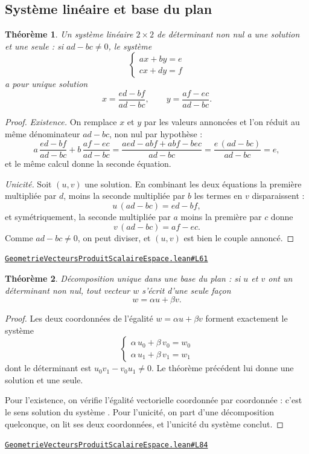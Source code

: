 \documentclass[11pt,a4paper]{article}
\theoremstyle{definition}
\theoremstyle{plain}
\newtheorem{theoreme}{Théorème}
\newcommand{\source}[2]{\par\smallskip\noindent\hfill{\footnotesize\href{#1}{\texttt{#2}}}\par\smallskip}
\begin{document}
\subsection{Système linéaire et base du plan}

\begin{theoreme}
Un système linéaire $2 \times 2$ de déterminant non nul a une solution et une seule :
si $ad - bc \ne 0$, le système
\[ \begin{cases} ax + by = e \\ cx + dy = f \end{cases} \]
a pour unique solution
\[ x = \frac{ed - bf}{ad - bc}, \qquad y = \frac{af - ec}{ad - bc} . \]
\end{theoreme}

\begin{proof}
\emph{Existence.} On remplace $x$ et $y$ par les valeurs annoncées et l'on réduit au même
dénominateur $ad - bc$, non nul par hypothèse :
\[ a\,\frac{ed - bf}{ad - bc} + b\,\frac{af - ec}{ad - bc}
   = \frac{aed - abf + abf - bec}{ad - bc}
   = \frac{e\,(ad - bc)}{ad - bc} = e , \]
et le même calcul donne la seconde équation.

\emph{Unicité.} Soit $(u, v)$ une solution. En combinant les deux équations \textemdash{}
la première multipliée par $d$, moins la seconde multipliée par $b$ \textemdash{} les
termes en $v$ disparaissent :
\[ u\,(ad - bc) = ed - bf , \]
et symétriquement, la seconde multipliée par $a$ moins la première par $c$ donne
\[ v\,(ad - bc) = af - ec . \]
Comme $ad - bc \ne 0$, on peut diviser, et $(u, v)$ est bien le couple annoncé.
\end{proof}
\source{https://github.com/Commutator-IO/learn-lean/blob/main/courses/02-lycee/08-geometrie-vecteurs-produit-scalaire-espace/GeometrieVecteursProduitScalaireEspace.lean\#L61}{GeometrieVecteursProduitScalaireEspace.lean\#L61}

\begin{theoreme}
Décomposition unique dans une base du plan : si $u$ et $v$ ont un déterminant non nul,
tout vecteur $w$ s'écrit d'une seule façon
\[ w = \alpha u + \beta v . \]
\end{theoreme}

\begin{proof}
Les deux coordonnées de l'égalité $w = \alpha u + \beta v$ forment exactement le système
\[ \begin{cases} \alpha\,u_0 + \beta\,v_0 = w_0 \\ \alpha\,u_1 + \beta\,v_1 = w_1 \end{cases} \]
dont le déterminant est $u_0 v_1 - v_0 u_1 \ne 0$. Le théorème précédent lui donne une
solution et une seule.

Pour l'existence, on vérifie l'égalité vectorielle coordonnée par coordonnée : c'est le
sens \og{} solution du système \fg{}. Pour l'unicité, on part d'une décomposition
quelconque, on lit ses deux coordonnées, et l'unicité du système conclut.
\end{proof}
\source{https://github.com/Commutator-IO/learn-lean/blob/main/courses/02-lycee/08-geometrie-vecteurs-produit-scalaire-espace/GeometrieVecteursProduitScalaireEspace.lean\#L84}{GeometrieVecteursProduitScalaireEspace.lean\#L84}
\end{document}

